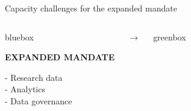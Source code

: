 \documentclass[aspectratio=169,11pt]{beamer}
\begin{document}
\begin{frame}{Capacity challenges for the expanded mandate}

\vspace{-0.35em}



\vspace{-0.6cm}


\begin{columns}[T,totalwidth=\textwidth]



\begin{beamercolorbox}[
    wd=\textwidth,
    ht=3.25cm,
    dp=0.15cm,
    sep=0.5cm,
    rounded=true
]{bluebox}


\textcolor{execblue}{\large\textbf{EXPANDED MANDATE}}

\vspace{0.16cm}

{\normalsize
- Research data\\
- Analytics\\
- Data governance
}

\end{beamercolorbox}



\vspace{1.25cm}

\centering
{\Large\textcolor{kipregrey}{$\longrightarrow$}}



\begin{beamercolorbox}[
    wd=\textwidth,
    ht=3.25cm,
    dp=0.15cm,
    sep=0.46cm,
    rounded=true
]{greenbox}



\end{beamercolorbox}
\end{columns}
\end{frame}
\end{document}
